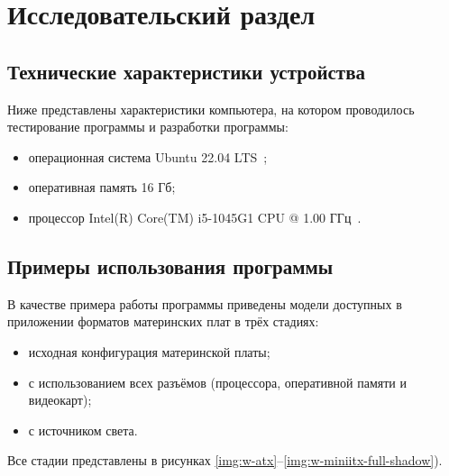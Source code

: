 \chapter{Исследовательский раздел}

\section{Технические характеристики устройства}

Ниже представлены характеристики компьютера, на котором проводилось тестирование программы и разработки программы:

\begin{itemize}[label=---]
    \item операционная система Ubuntu 22.04 LTS~\cite{};
    \item оперативная память 16 Гб;
    \item процессор Intel(R) Core(TM) i5-1045G1 CPU @ 1.00 ГГц~\cite{intel}.
\end{itemize}

\section{Примеры использования программы}

В качестве примера работы программы приведены модели доступных в приложении форматов материнских плат в трёх стадиях:
\begin{itemize}[label=---]
	\item исходная конфигурация материнской платы;
	\item с использованием всех разъёмов (процессора, оперативной памяти и видеокарт);
	\item с источником света.
\end{itemize}
Все стадии представлены в рисунках \ref{img:w-atx}--\ref{img:w-miniitx-full-shadow}).

\clearpage

